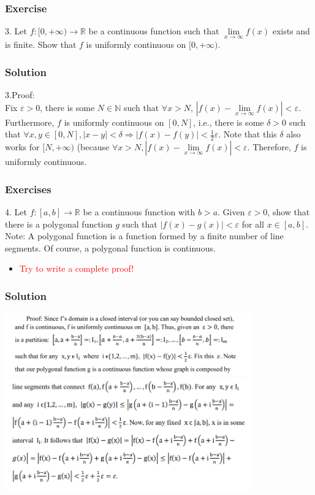 \documentclass{beamer}
\begin{document}
    \begin{frame}
        \frametitle{Exercise}
        3. Let $f:[0,+\infty)\to \mathbb{R}$ be a continuous function such that 
        $\underset{x\to \infty}{\lim}⁡ f(x)$ exists and is finite. 
        Show that $f$ is uniformly continuous on $[0, +\infty)$.    
    \end{frame}
    \begin{frame}
        \frametitle{Solution}
    3.Proof:\\
    \hspace{1em}Fix $\varepsilon > 0$, there is some $N \in \mathbb{N}$ such that $\forall x > N$, $|f(x) - \underset{x\to \infty}{\lim} f(x)| < \varepsilon.$
    Furthermore, $f$ is uniformly continuous on $[0,N]$, i.e., there is some $\delta > 0$ such that 
    $\forall x, y \in [0,N], |x - y| < \delta \Rightarrow |f(x) - f(y)| < \frac{1}{2}\varepsilon$. 
    Note that this $\delta$ also works for 
    $[N, +\infty)$ (because $\forall x > N, |f(x) - \underset{x\to \infty}{\lim} f(x)| < \varepsilon$. 
    Therefore, $f$ is uniformly continuous.
    \end{frame}
    \begin{frame}
        \frametitle{Exercises}
        4. Let $f:[a,b]\to \mathbb{R}$ be a continuous function with $b>a$. 
        Given $\varepsilon>0$, show that there is a polygonal function $g$ such that 
        $|f(x)-g(x)|<\varepsilon$ for all $x \in [a,b]$.\\
        \vspace{3em}
        Note: A polygonal function is a function formed by a finite number of line segments.
         Of course, a polygonal function is continuous. 
        
        \vspace{2em}
        \begin{itemize}
            \item \textcolor{red}{Try to write a complete proof!}
        \end{itemize}
    \end{frame}
    \begin{frame}
        \frametitle{Solution}
        \includegraphics[width=0.8\textwidth]{ex10_1.png}
        \includegraphics[width=0.8\textwidth]{ex10_2.png}
    \end{frame}
\end{document}
